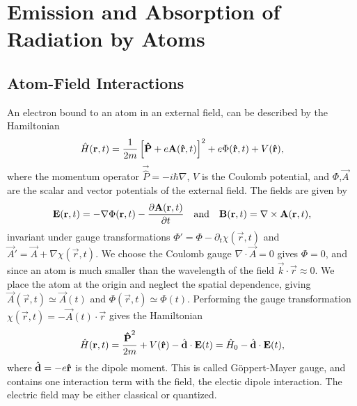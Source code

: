 \section{Emission and Absorption of Radiation by Atoms}

\subsection{Atom-Field Interactions}
An electron bound to an atom in an external field, can be described by the Hamiltonian
\begin{equation}
    \hat{H}(\bm{\mathrm{r}}, t) = \frac{1}{2m} \left[ \bm{\mathrm{\hat{P}}} + e\bm{\mathrm{A}}(\bm{\mathrm{\hat{r}}}, t) \right]^2 + e \Phi(\bm{\mathrm{\hat{r}}}, t) + V(\bm{\mathrm{\hat{r}}}),
\end{equation}
where the momentum operator $\vec{\hat{P}} = -i\hbar\nabla$, $V$ is the Coulomb potential, and $\Phi$,$\vec{A}$ are the scalar and vector potentials of the external field. The fields are given by
\begin{equation}
    \bm{\mathrm{E}}(\bm{\mathrm{r}}, t) = -\nabla \Phi(\bm{\mathrm{r}}, t) - \frac{\partial \bm{\mathrm{A}}(\bm{\mathrm{r}}, t)}{\partial t} \quad\text{and}\quad \bm{\mathrm{B}}(\bm{\mathrm{r}}, t) = \nabla \times \bm{\mathrm{A}}(\bm{\mathrm{r}}, t),
\end{equation}
invariant under gauge transformations $\Phi' = \Phi - \partial_t \chi(\vec{r}, t)$ and $\vec{A}' = \vec{A} + \nabla \chi(\vec{r}, t)$. We choose the Coulomb gauge $\nabla \cdot \vec{A} = 0$ gives $\Phi = 0$, and since an atom is much smaller than the wavelength of the field $\vec{k} \cdot \vec{r} \approx 0$. We place the atom at the origin and neglect the spatial dependence, giving $\vec{A}(\vec{r}, t)\simeq \vec{A}(t)$ and $\Phi(\vec{r}, t)\simeq \Phi(t)$. Performing the gauge transformation $\chi(\vec{r}, t) = -\vec{A}(t) \cdot \vec{r}$ gives the Hamiltonian
\begin{equation}
    \hat{H}(\bm{\mathrm{r}},t) = \frac{\bm{\mathrm{\hat{P}}}^2}{2m} + V(\bm{\mathrm{\hat r}}) - \hat{\bm{\mathrm{d}}} \cdot \bm{\mathrm{E}}(t) = \hat{H}_0 - \hat{\bm{\mathrm{d}}} \cdot \bm{\mathrm{E}}(t), 
\end{equation}
where $\hat{\bm{\mathrm{d}}} = -e \bm{\mathrm{\hat r}}$ is the dipole moment. This is called Göppert-Mayer gauge, and contains one interaction term with the field, the electic dipole interaction. The electric field may be either classical or quantized. 

